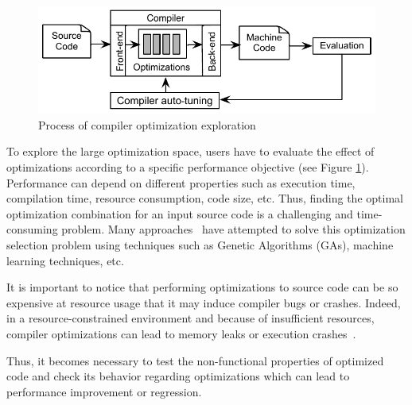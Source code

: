 \begin{figure}[ht]
	\centering
	\includegraphics[width=0.75\linewidth]{chapitre3/fig/autotuning.pdf}
	\caption{Process of compiler optimization exploration}
	\label{fig:autotuning.pdf}
\end{figure}

To explore the large optimization space, users have to evaluate the effect of optimizations according to a specific performance objective (see Figure \ref{fig:autotuning.pdf}). Performance can depend on different properties such as execution time, compilation time, resource consumption, code size, etc.
Thus, finding the optimal optimization combination for an input source code is a challenging and time-consuming problem. 
Many approaches~\cite{hoste2008cole,martins2014exploration} have attempted to solve this optimization selection problem using techniques such as Genetic Algorithms (GAs), machine learning techniques, etc.

It is important to notice that performing optimizations to source code can be so expensive at resource usage that it may induce compiler bugs or crashes. 
Indeed, in a resource-constrained environment and because of insufficient resources, compiler optimizations can lead to memory leaks or execution crashes~\cite{yang2011finding}. 

Thus, it becomes necessary to test the non-functional properties of optimized code and check its behavior regarding optimizations which can lead to performance improvement or regression.





